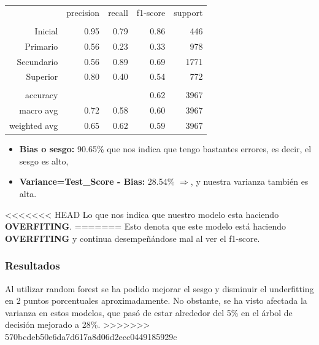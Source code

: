 \documentclass[a4paper]{article}
\begin{document}
\begin{itemize}
            \begin{table}[!ht]
                \centering
                \begin{tabular}{rrrrr}
                    ~ & precision & recall & f1-score & support \\
                    & & & & \\
                    Inicial    & 0.95 & 0.79 & 0.86 & 446 \\
                    Primario   & 0.56 & 0.23 & 0.33 & 978 \\
                    Secundario & 0.56 & 0.89 & 0.69 & 1771 \\
                    Superior   & 0.80 & 0.40 & 0.54 & 772 \\
                    & & & & \\
                    accuracy & & & 0.62 & 3967 \\
                    macro avg & 0.72 & 0.58 & 0.60 & 3967 \\
                    weighted avg & 0.65 & 0.62 & 0.59 & 3967 \\
                \end{tabular}
            \end{table}
            
            \begin{itemize}
                \item \textbf{Bias o sesgo:} 90.65\% que nos indica que tengo bastantes errores, es decir, el sesgo es alto,
                \item \textbf{Variance=Test\_Score - Bias:} 28.54\% $\Rightarrow$, y nuestra varianza también es alta. 
            \end{itemize} 

<<<<<<< HEAD
            Lo que nos indica que nuestro modelo esta haciendo \textbf{OVERFITING}.
=======
            Esto denota que este modelo está haciendo \textbf{OVERFITING} y continua desempeñándose mal al ver el f1-score.
            
            \subsubsection*{Resultados}
            
             Al utilizar random forest  se ha podido mejorar el sesgo y disminuir el underfitting en 2 puntos porcentuales aproximadamente. No obstante, se ha visto afectada la varianza en estos modelos, que pasó de estar alrededor del 5\% en el árbol de decisión mejorado a 28\%.
>>>>>>> 570bcdeb50e6da7d617a8d06d2ecc0449185929c


\end{itemize}
\end{document}
